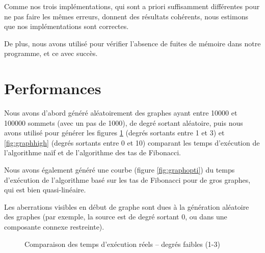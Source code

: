 \documentclass[12p0t,a4paper]{article}
\begin{document}
Comme nos trois implémentations, qui sont a priori suffisamment différentes pour ne pas faire les mêmes erreurs, donnent des résultats cohérents, nous estimons que nos implémentations sont correctes.

De plus, nous avons utilisé  pour vérifier l'absence de fuites de mémoire dans notre programme, et ce avec succès.

\section{Performances}

Nous avons d'abord généré aléatoirement des graphes ayant entre 10000 et 100000 sommets (avec un pas de 1000), de degré sortant aléatoire, puis nous avons utilisé  pour générer les figures \ref{fig:graphlow} (degrés sortants entre 1 et 3) et \ref{fig:graphhigh} (degrés sortants entre 0 et 10) comparant les temps d'exécution de l'algorithme naïf et de l'algorithme des tas de Fibonacci.

Nous avons également généré une courbe (figure \ref{fig:graphopti}) du temps d'exécution de l'algorithme basé sur les tas de Fibonacci pour de gros graphes, qui est bien quasi-linéaire.

Les aberrations visibles en début de graphe sont dues à la génération aléatoire des graphes (par exemple, la source est de degré sortant 0, ou dans une composante connexe restreinte).

\begin{figure}[h!]
  \begin{center}
    \caption{Comparaison des temps d'exécution réels -- degrés faibles (1-3)}
    \label{fig:graphlow}
  \end{center}
\end{figure}
\end{document}
